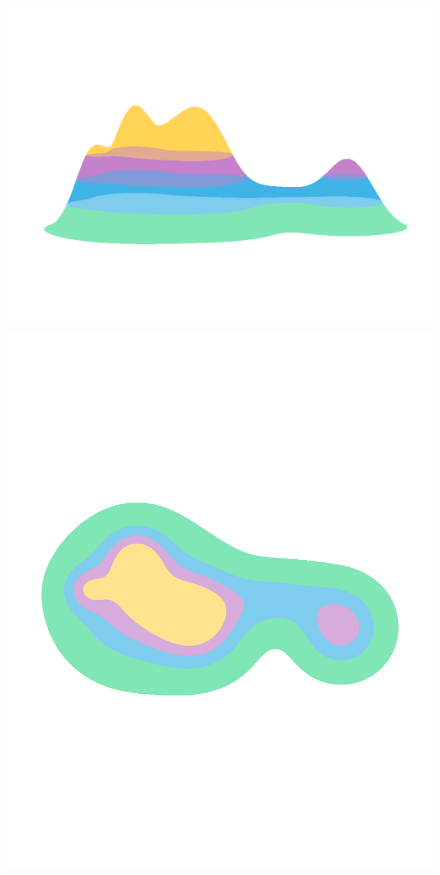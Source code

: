 \begin{figure}[htbp]
  \centering
  \includegraphics[trim=50 130 0 200, clip, scale=0.25]{scripts/figures/scalar.png}
  \includegraphics[trim=70 350 0 370, clip, scale=0.25]{scripts/figures/scalar_levels.png}

\end{figure}

